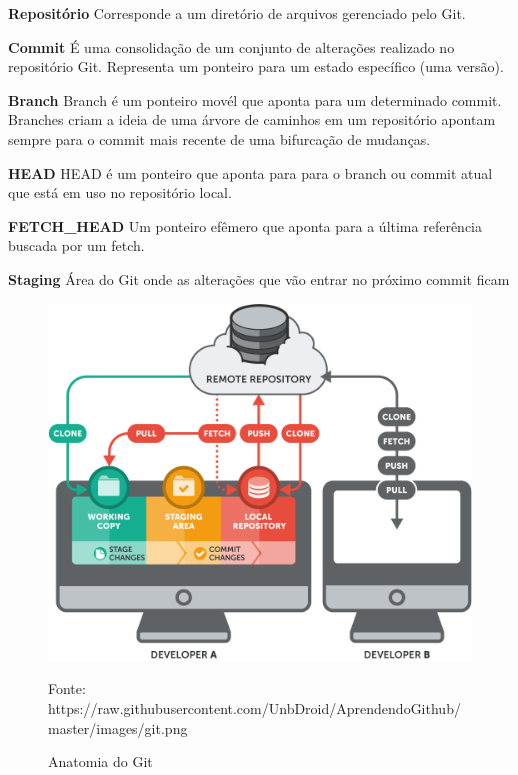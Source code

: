 \documentclass[twosideprint]{politex}
\newcommand{\legend}[1]{\begin{center}\def\caption{}\caption{#1}\end{center}}
\begin{document}
	\textbf{Repositório}
	\newline
	Corresponde a um diretório de arquivos gerenciado pelo Git.
	
	\textbf{Commit}
	\newline
	É uma consolidação de um conjunto de alterações realizado no repositório Git. Representa um ponteiro para um estado específico (uma versão).
	
	\textbf{Branch}
	\newline
	Branch é um ponteiro movél que aponta para um determinado commit. Branches criam a ideia de uma árvore de caminhos em um repositório apontam sempre para o commit mais recente de uma bifurcação de mudanças.
	
	\textbf{HEAD}
	\newline
	HEAD é um ponteiro que aponta para para o branch ou commit atual que está em uso no repositório local.
	
	\textbf{FETCH\_HEAD}
	\newline
	Um ponteiro efêmero que aponta para a última referência buscada por um fetch.
	
	\textbf{Staging}
	\newline
	Área do Git onde as alterações que vão entrar no próximo commit ficam
	
	\begin{figure}[!htbp]
		\caption{\label{fig_git1}Anatomia do Git}
		\begin{center}
		\includegraphics[scale=0.4]{pictures/git.png}
		\end{center}
		\legend{Fonte: https://raw.githubusercontent.com/UnbDroid/AprendendoGithub/master/images/git.png}
	\end{figure}
	
\end{document}
